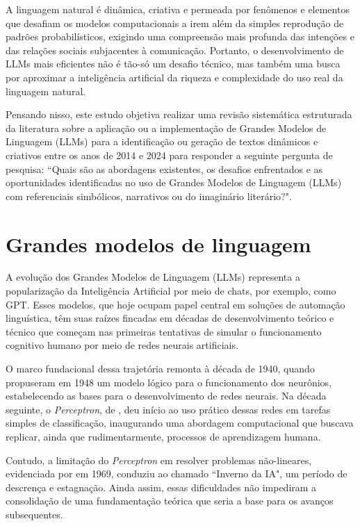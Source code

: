 \documentclass[portuguese]{textolivre}
\begin{document}
A linguagem natural é dinâmica, criativa e permeada por fenômenos e elementos que desafiam os modelos computacionais a irem além da simples reprodução de padrões probabilísticos, exigindo uma compreensão mais profunda das intenções e das relações sociais subjacentes à comunicação. Portanto, o desenvolvimento de LLMs mais eficientes não é tão-só um desafio técnico, mas também uma busca por aproximar a inteligência artificial da riqueza e complexidade do uso real da linguagem natural.

Pensando nisso, este estudo objetiva realizar uma revisão sistemática estruturada da literatura sobre a aplicação ou a implementação de Grandes Modelos de Linguagem (LLMs) para a identificação ou geração de textos dinâmicos e criativos entre os anos de 2014 e 2024 para responder a seguinte pergunta de pesquisa: ``Quais são as abordagens existentes, os desafios enfrentados e as oportunidades identificadas no uso de Grandes Modelos de Linguagem (LLMs) com referenciais simbólicos, narrativos ou do imaginário literário?".

\section{Grandes modelos de linguagem}
A evolução dos Grandes Modelos de Linguagem (LLMs) representa a popularização da Inteligência Artificial por meio de chats, por exemplo, como GPT. Esses modelos, que hoje ocupam papel central em soluções de automação linguística, têm suas raízes fincadas em décadas de desenvolvimento teórico e técnico que começam nas primeiras tentativas de simular o funcionamento cognitivo humano por meio de redes neurais artificiais. 

O marco fundacional dessa trajetória remonta à década de 1940, quando \textcite{mcculloch1990} propuseram em 1948 um modelo lógico para o funcionamento dos neurônios, estabelecendo as bases para o desenvolvimento de redes neurais. Na década seguinte, o \textit{Perceptron}, de \textcite{rosenblatt1958}, deu início ao uso prático dessas redes em tarefas simples de classificação, inaugurando uma abordagem computacional que buscava replicar, ainda que rudimentarmente, processos de aprendizagem humana.

Contudo, a limitação do \textit{Perceptron} em resolver problemas não-lineares, evidenciada por \textcite{minsky2017perceptrons} em 1969, conduziu ao chamado ``Inverno da IA", um período de descrença e estagnação. Ainda assim, essas dificuldades não impediram a consolidação de uma fundamentação teórica que seria a base para os avanços subsequentes.
\end{document}
